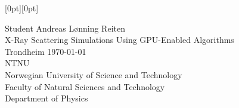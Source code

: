 \documentclass[11pt,twoside]{report}
\newlength{\PictHOffset}
\newlength{\PictVOffset}
\begin{document}
\begin{titlepage}
   \noindent\hspace*{-\PictHOffset}%
   \raisebox{\PictVOffset}[0pt][0pt]{}
   

   \begin{center}
     
	{\sffamily\selectfont%
	\flushleft\Large {\color{titlecolourgold}Student Andreas Lønning Reiten\\}
	\vspace{20pt}
	\huge{\color{titlecolourgold}X-Ray Scattering Simulations Using GPU-Enabled Algorithms}
	\\[3cm]
	\vspace{-55pt}      
	\large{{\color{gray}Trondheim \today\\}}
	\vfill
	\normalsize{\color{titlecolourgold}NTNU \\ Norwegian University of Science and Technology\\Faculty of 		Natural Sciences and Technology \\ Department of Physics\\}
	}
     
   \end{center}
\end{titlepage}
\end{document}
